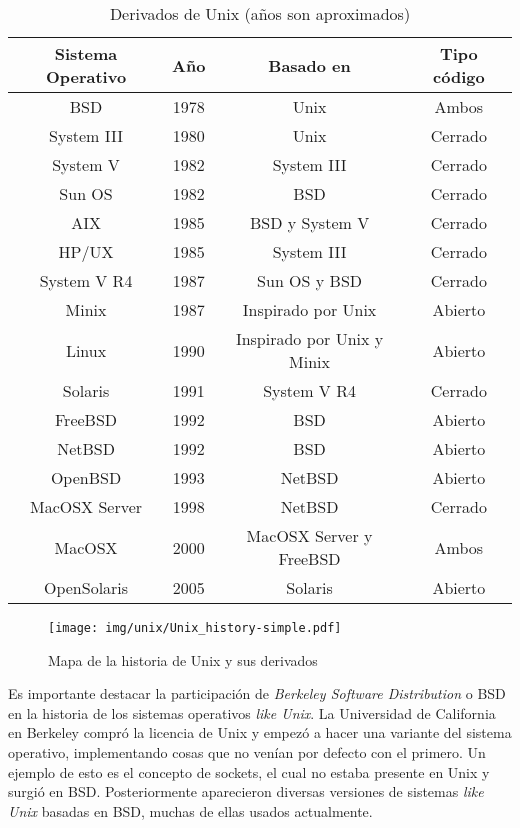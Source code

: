\begin{table}[h]
	\centering
	\begin{tabular}{|c|c|c|c|}
		\hline
			Sistema Operativo		& Año		& Basado en 									& Tipo código \\
		\hline
			BSD									&	1978	& Unix												& Ambos \\
			System III					& 1980 	& Unix												& Cerrado \\
			System V						& 1982 	& System III									& Cerrado \\
			Sun OS							& 1982  & BSD													& Cerrado \\
			AIX									& 1985	& BSD y System V							& Cerrado \\
			HP/UX								& 1985	& System III									& Cerrado \\
			System V R4					& 1987	& Sun OS y BSD								& Cerrado \\
			Minix								& 1987	& Inspirado por Unix					& Abierto \\
			Linux								& 1990	& Inspirado por Unix y Minix	& Abierto \\
			Solaris							& 1991	& System V R4									& Cerrado \\
			FreeBSD							& 1992  & BSD													& Abierto \\
			NetBSD							& 1992 	& BSD 												& Abierto \\
			OpenBSD							& 1993 	& NetBSD											& Abierto \\
			MacOSX Server				& 1998	& NetBSD											& Cerrado \\
			MacOSX							& 2000	& MacOSX Server y FreeBSD			& Ambos \\
			OpenSolaris					& 2005 	& Solaris											& Abierto \\
		\hline
	\end{tabular}
	\caption{Derivados de Unix (años son aproximados)}
	\label{derivados_de_unix}
\end{table}

\begin{figure}[htbp]
\centering
\texttt{[image: img/unix/Unix\_history-simple.pdf]}
\caption{Mapa de la historia de Unix y sus derivados}
\label{fig:unix_history}
\end{figure}

Es importante destacar la participación de \textit{Berkeley Software Distribution} o BSD en la historia de los sistemas operativos \textit{like Unix}. La Universidad de California en Berkeley compró la licencia de Unix y empezó a hacer una variante del sistema operativo, implementando cosas que no venían por defecto con el primero. Un ejemplo de esto es el concepto de sockets, el cual no estaba presente en Unix y surgió en BSD. Posteriormente aparecieron diversas versiones de sistemas \textit{like Unix} basadas en BSD, muchas de ellas usados actualmente.

